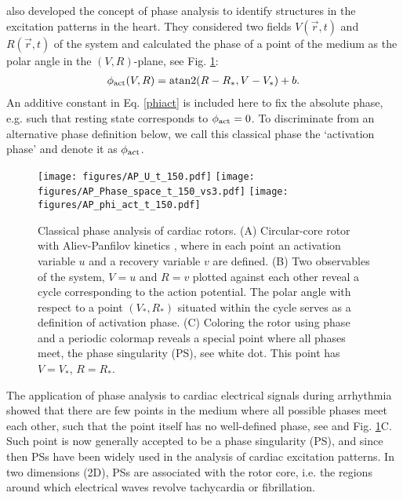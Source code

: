 \documentclass{article}
\newcommand{\phiact}{\ensuremath{\phi_{\rm act}}}
\newcommand{\VS}{V_*}
\newcommand{\RS}{R_*}
\begin{document}
\cite{Gray:1998} also developed the concept of phase analysis to identify structures in the excitation patterns in the heart. 
They considered two fields $V(\vec{r},t)$ and $R(\vec{r},t)$ of the system and calculated the phase of a point of the medium as the polar angle in the $(V,R)$-plane, see Fig. \ref{fig:classic}:
\begin{align}
   \phiact(V,R) = \mathrm{atan2}( R-\RS, V-\VS) + b.  \label{phiact}
\end{align}
An additive constant in Eq. \eqref{phiact} is included here to fix the absolute phase, e.g. such that resting state corresponds to $\phiact =0$. To discriminate from an alternative phase definition below, we call this classical phase the `activation phase' and denote it as $\phiact$. 
\begin{figure}
    \centering
    \texttt{[image: figures/AP\_U\_t\_150.pdf]}
    \texttt{[image: figures/AP\_Phase\_space\_t\_150\_vs3.pdf]}
      \texttt{[image: figures/AP\_phi\_act\_t\_150.pdf]} \\
    \caption{Classical phase analysis of cardiac rotors. (A) Circular-core rotor with Aliev-Panfilov kinetics \citep{Aliev:1996}, where in each point an activation variable $u$ and a recovery variable $v$ are defined. (B) Two observables of the system, $V=u$ and $R=v$ plotted against each other reveal a cycle corresponding to the action potential. The polar angle with respect to a point $(\VS, \RS)$ situated within the cycle serves as a definition of activation phase. (C) Coloring the rotor using phase and a periodic colormap reveals a special point where all phases meet, the phase singularity (PS), see white dot. This point has $V=\VS$, $R=\RS$. }
    \label{fig:classic}
\end{figure}

The application of phase analysis to cardiac electrical signals during arrhythmia showed that there are few points in the medium where all possible phases meet each other, such that the point itself has no well-defined phase, see \citep{Gray:1998} and Fig. \ref{fig:classic}C. Such point is now generally accepted to be a phase singularity (PS), and since then PSs have been widely used in the analysis of cardiac excitation patterns. 
In two dimensions (2D), PSs are associated with the rotor core, i.e. the regions around which electrical waves revolve tachycardia or fibrillation. 
\end{document}
